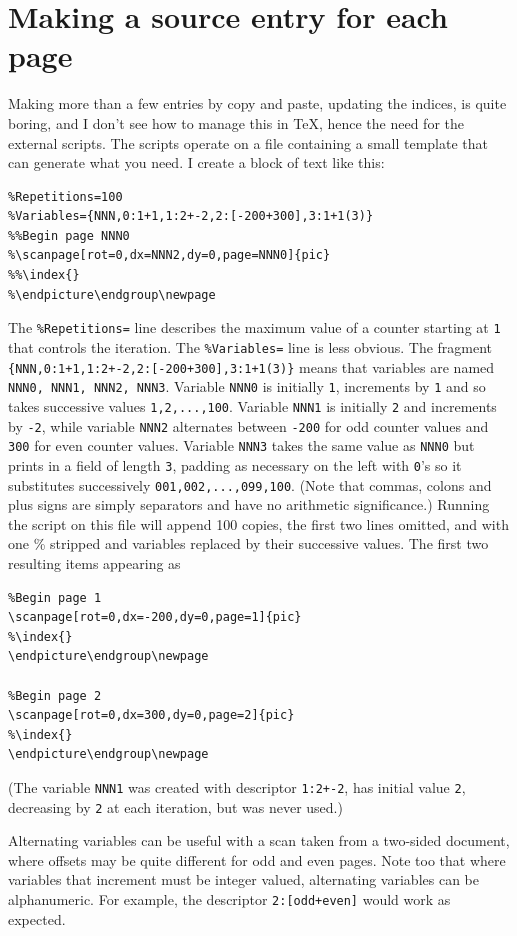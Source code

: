 \documentclass[11pt]{article}
\begin{document}
\section{Making a source entry for each page}
Making more than a few entries by copy and paste, updating the indices, is quite boring, and I don't see how to manage this in \TeX, hence the need for the external scripts. The scripts operate on a file containing  a small template that can generate what you need. I create a block of text like this:
\begin{verbatim}
%Repetitions=100
%Variables={NNN,0:1+1,1:2+-2,2:[-200+300],3:1+1(3)}
%%Begin page NNN0
%\scanpage[rot=0,dx=NNN2,dy=0,page=NNN0]{pic}
%%\index{}
%\endpicture\endgroup\newpage
\end{verbatim}
The \verb|%Repetitions=|
 line describes the maximum value of a counter starting at {\tt 1} that controls the iteration. The \verb|%Variables=|
  line is less obvious. 
The fragment \verb|{NNN,0:1+1,1:2+-2,2:[-200+300],3:1+1(3)}| means that variables are named {\tt NNN0, NNN1, NNN2, NNN3}. Variable {\tt NNN0} is initially {\tt1}, increments by {\tt1} and  so takes successive values {\tt 1,2,...,100}. Variable {\tt NNN1} is initially {\tt2} and increments by {\tt -2}, while variable {\tt NNN2} alternates between {\tt -200} for odd counter values and {\tt300} for even counter values. Variable {\tt NNN3} takes the same value as {\tt NNN0} but prints in a field of length {\tt 3}, padding as necessary on the left with {\tt0}'s so it substitutes successively {\tt 001,002,...,099,100}. (Note that commas, colons and plus signs are simply separators and have no arithmetic significance.) Running the script on this file  will append 100 copies, the first two lines omitted, and with one \% stripped and variables replaced by their successive values. The first two resulting items appearing as
\begin{verbatim}
%Begin page 1
\scanpage[rot=0,dx=-200,dy=0,page=1]{pic}
%\index{}
\endpicture\endgroup\newpage

%Begin page 2
\scanpage[rot=0,dx=300,dy=0,page=2]{pic}
%\index{}
\endpicture\endgroup\newpage
\end{verbatim}
 (The variable {\tt NNN1} was created with descriptor {\tt1:2+-2}, has initial value {\tt 2}, decreasing by {\tt 2} at each iteration, but was never used.) 
 
  Alternating variables can be useful with a scan taken from a two-sided document, where offsets may be quite different for odd and even pages. Note too that where variables that increment must be integer valued, alternating variables can be alphanumeric. For example, the descriptor {\tt2:[odd+even]} would work as expected.
  
\end{document}
